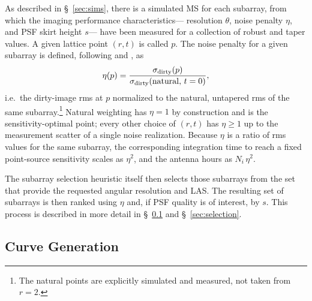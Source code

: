 \documentclass[11pt]{article}
\begin{document}
As described in \S~\ref{sec:sims}, there is a simulated MS for each
subarray, from which the imaging performance characteristics---
resolution $\theta$, noise penalty $\eta$, and PSF skirt height $s$---
have been measured for a collection of robust and taper values.  A
given lattice point $(r,t)$ is called $p$.  The noise penalty for a
given subarray is defined, following \citep{memo55} and
\citep{memo121}, as
\begin{equation}
  \eta(p) = \frac{\sigma_{\rm dirty}(p)}{\sigma_{\rm dirty}({\rm natural},\,t=0)} ,
\end{equation}
i.e.\ the dirty-image rms at $p$ normalized to the natural,
untapered rms of the same subarray.\footnote{The natural points are
explicitly simulated and measured, not taken from $r=2$.}  Natural
weighting has $\eta = 1$ by construction and is the
sensitivity-optimal point; every other choice of $(r,t)$ has
$\eta \ge 1$ up to the measurement scatter of a single noise
realization.  Because $\eta$ is a ratio of rms values for the same
subarray, the corresponding integration time to reach a fixed
point-source sensitivity scales as $\eta^2$, and the antenna hours as
$N_i\,\eta^2$.

The subarray selection heuristic itself then selects those subarrays
from the set that provide the requested angular resolution and LAS.
The resulting set of subarrays is then ranked using $\eta$ and, if
PSF quality is of interest, by $s$. This process is described in
more detail in \S~\ref{sec:curvegen} and \S~\ref{sec:selection}.


\subsection{Curve Generation}
\label{sec:curvegen}
\end{document}
